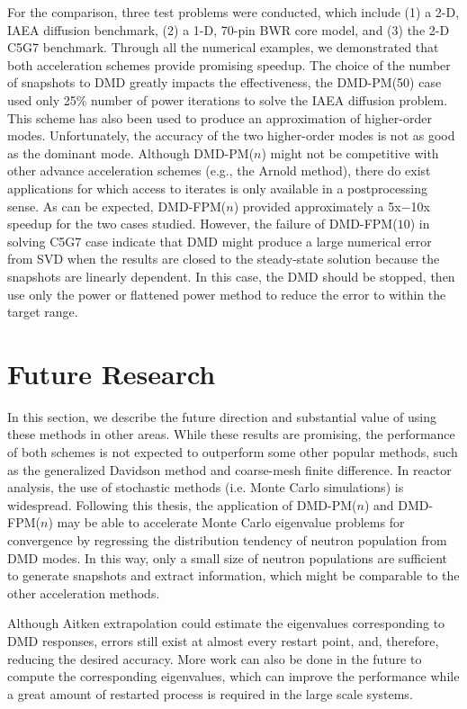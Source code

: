 For the comparison, three test problems were conducted, which include (1) a 2-D, IAEA diffusion benchmark, (2) a 1-D, 70-pin BWR core model, and (3) the 2-D C5G7 benchmark.
Through all the numerical examples, we demonstrated that both acceleration schemes provide promising speedup. 
The choice of the number of snapshots to DMD greatly impacts the effectiveness, the DMD-PM(50) case used only 25\% number of power iterations to solve the IAEA diffusion problem.
This scheme has also been used to produce an approximation of higher-order modes.
Unfortunately, the accuracy of the two higher-order modes is not as good as the dominant mode.
Although DMD-PM($n$) might not be competitive with other advance acceleration schemes (e.g., the Arnold method), there do exist applications for which access to iterates is only available in a postprocessing sense.
As can be expected, DMD-FPM($n$) provided approximately a 5x$-$10x speedup for the two cases studied.
However, the failure of DMD-FPM($10$) in solving C5G7 case indicate that DMD might produce a large numerical error from SVD when the results are closed to the steady-state solution because the snapshots are linearly dependent.
In this case, the DMD should be stopped, then use only the power or flattened power method to reduce the error to within the target range.

\section{Future Research}

In this section, we describe the future direction and substantial value of using these methods in other areas.
While these results are promising, the performance of both schemes is not expected to outperform some other popular methods, such as the generalized Davidson method\cite{hamilton2011numerical} and coarse-mesh finite difference\cite{smith_1983}.
In reactor analysis, the use of stochastic methods (i.e. Monte Carlo simulations) is widespread.
Following this thesis, the application of DMD-PM($n$) and DMD-FPM($n$) may be able to accelerate Monte Carlo eigenvalue problems for convergence by regressing the distribution tendency of neutron population from DMD modes.
In this way, only a small size of neutron populations are sufficient to generate snapshots and extract information, which might be comparable to the other acceleration methods.

Although Aitken extrapolation could estimate the eigenvalues corresponding to DMD responses, errors still exist at almost every restart point, and, therefore, reducing the desired accuracy. 
More work can also be done in the future to compute the corresponding eigenvalues, which can improve the performance while a great amount of restarted process is required in the large scale systems.
